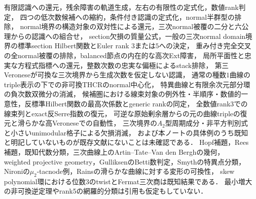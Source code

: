 \documentclass[11pt,a4paper]{ltjsarticle}
\begin{document}
\begin{description}[style=nextline]
\item[新規性が未確認の内容と未使用の分類]
有限認識への還元，残余障害の軌道生成，左右の有限性の定式化，数値rank判定，
四つの低次数候補への縮約，条件付き認識の定式化，normal半群型の排除，
normal境界の構造対象の双対性による還元，三次normal被覆の二分と六公理からの認識への組合せ，
section欠損の質量公式，一般の三次normal domain境界の標準section Hilbert関数とEuler rank $3$または$5$への決定，
重み付き完全交叉の全normal被覆の排除，balanced節点の内在的な高次Ext障害，
局所平面性と忠実な方程式指標への還元，整数次数の忠実な偏極によるstack排除，
第三Veroneseが可換な三次境界から生成次数を仮定しない認識，
通常の種数$1$曲線のtriple表示の下での非可換THCRのnormal中心化，
特異曲線と有限余次元部分環の負次数双微分の消滅，
候補圏における線束対象の例外性・半順序・数値的一意性，反標準Hilbert関数の最高次係数とgeneric rankの同定，
全数値rank3での線束列とexact反Serre指数の復元，
可逆な原始剰余層からの元の曲線tripleの復元と滑らかな高Veroneseでの自動性，
三次境界の$A_2$型周期成分・非平方判別式と小さいunimodular格子による欠損消滅，
および本ノートの具体例のうち既知と明記していないものが既存文献にないことは未確認である．
Hopf補題，Rees補題，既知代数分類，三次曲線上のArtin--Tate--Van den Berghの幾何，
weighted projective geometry，GulliksenのBetti数判定，Smythの特異点分類，
Nironiの$\mu_2$-tacnode例，Rainsの滑らかな曲線に対する変形の可換性，
skew polynomial環における位数$3$のtwistとFermat三次商は既知結果である．
最小増大の非可換逆定理やrank5の網羅的分類は引用も仮定もしていない．
\end{description}
\end{document}
